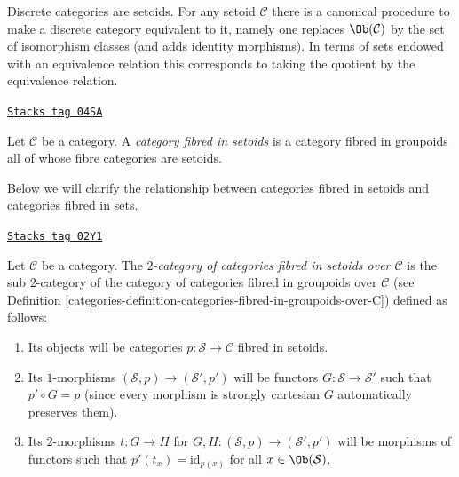 \medskip\noindent
Discrete categories are setoids. For any setoid $\mathcal{C}$ there is a
canonical procedure to make a discrete category equivalent to it, namely
one replaces $\Ob(\mathcal{C})$ by the set of isomorphism
classes (and adds identity morphisms). In terms of sets endowed
with an equivalence relation this corresponds to taking the quotient
by the equivalence relation.

\begin{definition}
\label{categories-definition-category-fibred-setoids}
\href{https://stacks.math.columbia.edu/tag/04SA}{\texttt{Stacks tag 04SA}}

Let $\mathcal{C}$ be a category. A {\it category fibred in setoids}
is a category fibred in groupoids all of whose fibre categories are
setoids.
\end{definition}

Below we will clarify the relationship between categories fibred in setoids
and categories fibred in sets.

\begin{definition}
\label{categories-definition-categories-fibred-in-setoids-over-C}
\href{https://stacks.math.columbia.edu/tag/02Y1}{\texttt{Stacks tag 02Y1}}

Let $\mathcal{C}$ be a category.
The {\it $2$-category of categories fibred in setoids over $\mathcal{C}$}
is the sub $2$-category of the category of categories fibred in groupoids
over $\mathcal{C}$ (see
Definition \ref{categories-definition-categories-fibred-in-groupoids-over-C})
defined as follows:
\begin{enumerate}
\item Its objects will be categories
$p : \mathcal{S} \to \mathcal{C}$ fibred in setoids.
\item Its $1$-morphisms $(\mathcal{S}, p) \to (\mathcal{S}', p')$
will be functors $G : \mathcal{S} \to \mathcal{S}'$ such that
$p' \circ G = p$ (since every morphism is strongly cartesian
$G$ automatically preserves them).
\item Its $2$-morphisms $t : G \to H$ for
$G, H : (\mathcal{S}, p) \to (\mathcal{S}', p')$
will be morphisms of functors
such that $p'(t_x) = \text{id}_{p(x)}$
for all $x \in \Ob(\mathcal{S})$.
\end{enumerate}
\end{definition}

